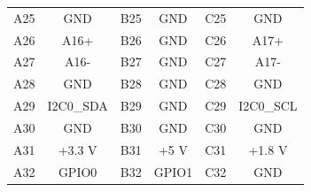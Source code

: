 \documentclass[a4paper]{article}
\begin{document}
\begin{table}[h]
\begin{center}
\begin{tabular}{cc|cc|cc}
            A25 & GND & B25 & GND & C25 & GND \\
            A26 & A16+ & B26 & GND & C26 & A17+ \\
            A27 & A16- & B27 & GND & C27 & A17- \\
            A28 & GND & B28 & GND & C28 & GND \\
            A29 & I2C0\_SDA & B29 & GND & C29 & I2C0\_SCL \\
            A30 & GND & B30 & GND & C30 & GND \\
            A31 & +3.3 V & B31 & +5 V & C31 & +1.8 V \\
            A32 & GPIO0 & B32 & GPIO1 & C32 & GND \\
            \hline
            \hline
        \end{tabular}
    \end{center}
\end{table}
\end{document}
